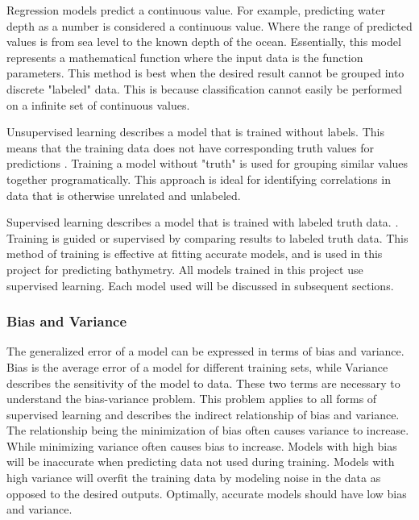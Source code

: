 \par
Regression models predict a continuous value.
For example, predicting water depth as a number is considered a continuous value.
Where the range of predicted values is from sea level to the known depth of the ocean.
Essentially, this model represents a mathematical function where the input data is the function parameters.
This method is best when the desired result cannot be grouped into discrete "labeled" data.
This is because classification cannot easily be performed on a infinite set of continuous values.

\par
Unsupervised learning describes a model that is trained without labels.
This means that the training data does not have corresponding truth values for predictions \cite{bishop2006pattern}.
Training a model without "truth" is used for grouping similar values together programatically.
This approach is ideal for identifying correlations in data that is otherwise unrelated and unlabeled.

\par
Supervised learning describes a model that is trained with labeled truth data. \cite{bishop2006pattern}.
Training is guided or supervised by comparing results to labeled truth data.
This method of training is effective at fitting accurate models, and is used in this project for predicting bathymetry.
All models trained in this project use supervised learning.
Each model used will be discussed in subsequent sections.

\subsubsection{Bias and Variance}
The generalized error of a model can be expressed in terms of bias and variance.
Bias is the average error of a model for different training sets, while Variance describes the sensitivity of the model to data.
These two terms are necessary to understand the bias-variance problem.
This problem applies to all forms of supervised learning \cite{geman1992neural} and describes the indirect relationship of bias and variance.
The relationship being the minimization of bias often causes variance to increase.
While minimizing variance often causes bias to increase.
Models with high bias will be inaccurate when predicting data not used during training.
Models with high variance will overfit \cite{cawley2010over} the training data by modeling noise in the data as opposed to the desired outputs.
Optimally, accurate models should have low bias and variance.

